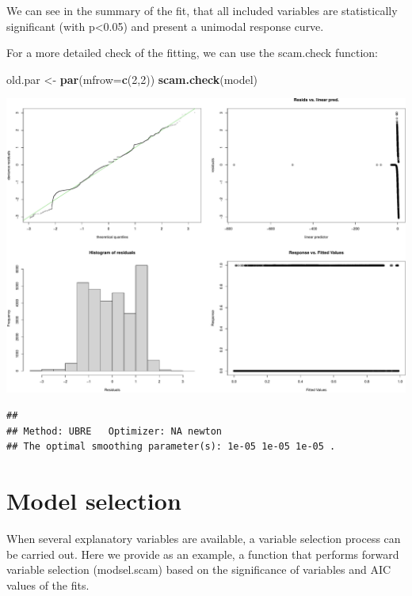 \documentclass[
]{book}
\newenvironment{Shaded}{\begin{snugshade}}{\end{snugshade}}
\newcommand{\AttributeTok}[1]{\textcolor[rgb]{0.13,0.29,0.53}{#1}}
\newcommand{\DecValTok}[1]{\textcolor[rgb]{0.00,0.00,0.81}{#1}}
\newcommand{\FunctionTok}[1]{\textcolor[rgb]{0.13,0.29,0.53}{\textbf{#1}}}
\newcommand{\NormalTok}[1]{#1}
\newcommand{\OtherTok}[1]{\textcolor[rgb]{0.56,0.35,0.01}{#1}}
\begin{document}
We can see in the summary of the fit, that all included variables are statistically significant (with p\textless0.05) and present a unimodal response curve.

For a more detailed check of the fitting, we can use the scam.check function:

\begin{Shaded}
\begin{Highlighting}[]
\NormalTok{old.par }\OtherTok{\textless{}{-}} \FunctionTok{par}\NormalTok{(}\AttributeTok{mfrow=}\FunctionTok{c}\NormalTok{(}\DecValTok{2}\NormalTok{,}\DecValTok{2}\NormalTok{))}
\FunctionTok{scam.check}\NormalTok{(model)}
\end{Highlighting}
\end{Shaded}

\includegraphics{_main_files/figure-latex/unnamed-chunk-64-1.pdf}

\begin{verbatim}
## 
## Method: UBRE   Optimizer: NA newton
## The optimal smoothing parameter(s): 1e-05 1e-05 1e-05 .
\end{verbatim}

\section{Model selection}\label{model-selection}

When several explanatory variables are available, a variable selection process can be carried out. Here we provide as an example, a function that performs forward variable selection (modsel.scam) based on the significance of variables and AIC values of the fits.
\end{document}

